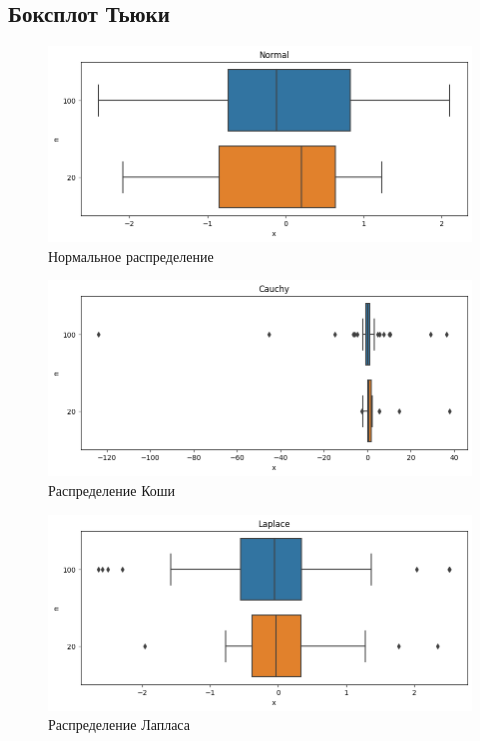 \subsection{Боксплот Тьюки}
\begin{figure}[H]
	\begin{center}
		\includegraphics[width=\textwidth]{tasks/3/res/1.png}
		\caption{Нормальное распределение}
	\end{center}
\end{figure}

\begin{figure}[H]
	\begin{center}
		\includegraphics[width=\textwidth]{tasks/3/res/2.png}
		\caption{Распределение Коши}
	\end{center}
\end{figure}

\begin{figure}[H]
	\begin{center}
		\includegraphics[width=\textwidth]{tasks/3/res/3.png}
		\caption{Распределение Лапласа}
	\end{center}
\end{figure}

